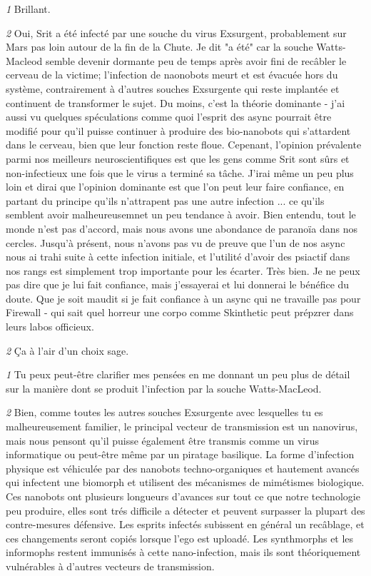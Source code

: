 \textit{\textit{1}} Brillant. 

\textit{\textit{2}} Oui, Srit a été infecté par une souche du virus Exsurgent, probablement sur Mars pas loin autour de la fin de la Chute. Je dit "a été" car la souche Watts-Macleod semble devenir dormante peu de temps après avoir fini de recâbler le cerveau de la victime; l'infection de naonobots meurt et est évacuée hors du système, contrairement à d'autres souches Exsurgente qui reste implantée et continuent de transformer le sujet. Du moins, c'est la théorie dominante - j'ai aussi vu quelques spéculations comme quoi l'esprit des async pourrait être modifié pour qu'il puisse continuer à produire des bio-nanobots qui  s'attardent dans le cerveau, bien que leur fonction reste floue. Cepenant, l'opinion prévalente parmi nos meilleurs neuroscientifiques est que les gens comme Srit sont sûrs et non-infectieux une fois que le virus a terminé sa tâche. J'irai même un peu plus loin et dirai que l'opinion dominante est que l'on peut leur faire confiance, en partant du principe qu'ils n'attrapent pas une autre infection ... ce qu'ils semblent avoir malheureusemnet un peu tendance à avoir. Bien entendu, tout le monde n'est pas d'accord, mais nous avons une abondance de paranoïa dans nos cercles. Jusqu'à présent, nous n'avons pas vu de preuve que l'un de nos async nous ai trahi suite à cette infection initiale, et l'utilité d'avoir des psiactif dans nos rangs est simplement trop importante pour les écarter. Très bien. Je ne peux pas dire que je lui fait confiance, mais j'essayerai et lui donnerai le bénéfice du doute. Que je soit maudit si je fait confiance à un async qui ne travaille pas pour Firewall - qui sait quel horreur une corpo comme Skinthetic peut prépzrer dans leurs labos officieux. 

\textit{\textit{2}} Ça à l'air d'un choix sage. 

\textit{\textit{1}} Tu peux peut-être clarifier mes pensées en me donnant un peu plus de détail sur la manière dont se produit l'infection par la souche Watts-MacLeod. 

\textit{\textit{2}} Bien, comme toutes les autres souches Exsurgente avec lesquelles tu es malheureusement familier, le principal vecteur de transmission est un nanovirus, mais nous pensont qu'il puisse également être transmis comme un virus informatique ou peut-être même par un piratage basilique. La forme d'infection physique est véhiculée par des nanobots techno-organiques et hautement avancés qui infectent une biomorph et utilisent des mécanismes de mimétismes biologique. Ces nanobots ont plusieurs longueurs d'avances sur tout ce que notre technologie peu produire, elles sont trés difficile a détecter et peuvent surpasser la plupart des contre-mesures défensive. Les esprits infectés subissent en général un recâblage, et ces changements seront copiés lorsque l'ego est uploadé. Les synthmorphs et les informophs restent immunisés à cette nano-infection, mais ils sont théoriquement vulnérables à d'autres vecteurs de transmission. 

